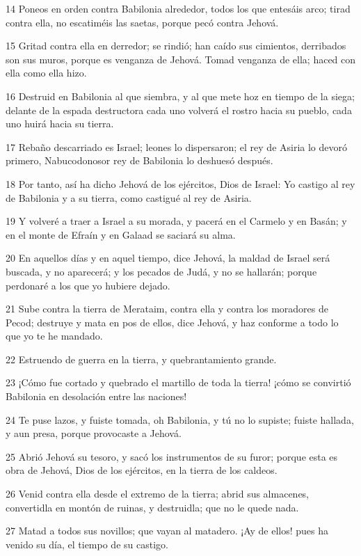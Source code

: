 \par 14 Poneos en orden contra Babilonia alrededor, todos los que entesáis arco; tirad contra ella, no escatiméis las saetas, porque pecó contra Jehová.
\par 15 Gritad contra ella en derredor; se rindió; han caído sus cimientos, derribados son sus muros, porque es venganza de Jehová. Tomad venganza de ella; haced con ella como ella hizo.
\par 16 Destruid en Babilonia al que siembra, y al que mete hoz en tiempo de la siega; delante de la espada destructora cada uno volverá el rostro hacia su pueblo, cada uno huirá hacia su tierra.
\par 17 Rebaño descarriado es Israel; leones lo dispersaron; el rey de Asiria lo devoró primero, Nabucodonosor rey de Babilonia lo deshuesó después.
\par 18 Por tanto, así ha dicho Jehová de los ejércitos, Dios de Israel: Yo castigo al rey de Babilonia y a su tierra, como castigué al rey de Asiria.
\par 19 Y volveré a traer a Israel a su morada, y pacerá en el Carmelo y en Basán; y en el monte de Efraín y en Galaad se saciará su alma.
\par 20 En aquellos días y en aquel tiempo, dice Jehová, la maldad de Israel será buscada, y no aparecerá; y los pecados de Judá, y no se hallarán; porque perdonaré a los que yo hubiere dejado.
\par 21 Sube contra la tierra de Merataim, contra ella y contra los moradores de Pecod; destruye y mata en pos de ellos, dice Jehová, y haz conforme a todo lo que yo te he mandado.
\par 22 Estruendo de guerra en la tierra, y quebrantamiento grande.
\par 23 ¡Cómo fue cortado y quebrado el martillo de toda la tierra! ¡cómo se convirtió Babilonia en desolación entre las naciones!
\par 24 Te puse lazos, y fuiste tomada, oh Babilonia, y tú no lo supiste; fuiste hallada, y aun presa, porque provocaste a Jehová.
\par 25 Abrió Jehová su tesoro, y sacó los instrumentos de su furor; porque esta es obra de Jehová, Dios de los ejércitos, en la tierra de los caldeos.
\par 26 Venid contra ella desde el extremo de la tierra; abrid sus almacenes, convertidla en montón de ruinas, y destruidla; que no le quede nada.
\par 27 Matad a todos sus novillos; que vayan al matadero. ¡Ay de ellos! pues ha venido su día, el tiempo de su castigo.
